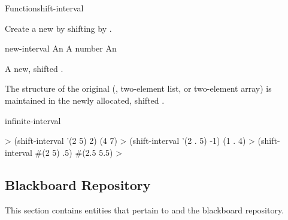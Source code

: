 \documentclass[10pt,twoside,english,pdftex]{article}
\begin{document}
\begin{functiondoc}{Function}{shift-interval}%
  {
    }
%
%

\fnsyntax

\fnpurpose Create a new  by shifting  by
.

\fnpackage {}

\fnmodule {}

\fnargs
\begin{args}{new-interval}
\arg[interval] An 
\arg[amount] A number
 An 
\end{args}

\fnreturns A new, shifted .

\fndescription The structure of the original 
(, two-element list, or two-element array) is maintained in the
newly allocated, shifted .

\begin{alsos}{infinite-interval}
\end{alsos}

\fnexamples
%
\W\supp
\begin{example}
  > (shift-interval '(2 5) 2)
  (4 7)
  > (shift-interval '(2 . 5) -1)
  (1 . 4)
  > (shift-interval #(2 5) .5)
  #(2.5 5.5)
  >
\end{example}

\end{functiondoc}


\T\markright{}%
\T\pagestyle{plain}
\T\clearpage
\W{}
\T\pagestyle{fancy}
\T\thispagestyle{fancybottom}
\T\global\def\fnlastname{ }%

\subsection{Blackboard Repository}
\label{sec:bb-repository}%

This section contains  entities that pertain to
 and the blackboard repository.
\end{document}

